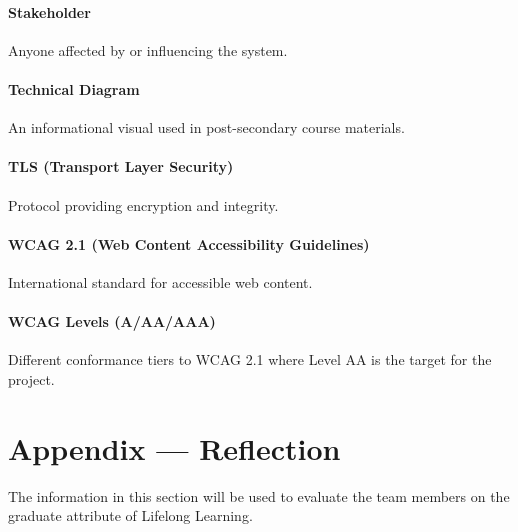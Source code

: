\documentclass[12pt, titlepage]{article}
\begin{document}
\paragraph*{Stakeholder}
Anyone affected by or influencing the system.

\paragraph*{Technical Diagram}
An informational visual used in post-secondary course materials.

\paragraph*{TLS (Transport Layer Security)}
Protocol providing encryption and integrity.

\paragraph*{WCAG 2.1 (Web Content Accessibility Guidelines)}
International standard for accessible web content.

\paragraph*{WCAG Levels (A/AA/AAA)}
Different conformance tiers to WCAG 2.1 where Level AA is the target
for the project.

\newpage{}
\section*{Appendix --- Reflection}

The information in this section will be used to evaluate the team members on the
graduate attribute of Lifelong Learning.


\\
\end{document}
